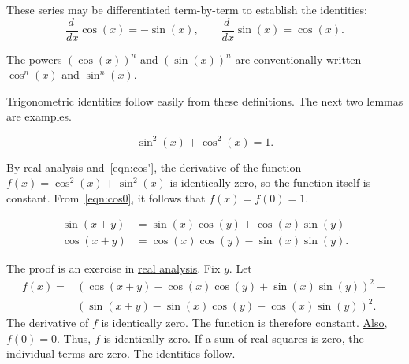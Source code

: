 These series may be differentiated term-by-term to establish the identities:
%
    \begin{equation}\label{eqn:cos'}
    \frac{d\phantom{~}} {dx}\cos(x) = -\sin(x),\qquad \frac{ d\phantom{~} }{dx}\sin(x) = \cos(x).
    \end{equation}

The powers $(\cos(x))^n$ and $(\sin(x))^n$ are conventionally written
$\cos^n(x)$ and $\sin^n(x)$.

Trigonometric identities follow easily from these definitions.  The next two lemmas are examples.
%

\begin{lemma}\label{lemma:circle} 
   $$\sin^2(x) + \cos^2(x) = 1.$$
\end{lemma}
%

\begin{proved}
By \hyperref[back:analysis]{real analysis} and~\eqref{eqn:cos'},
the derivative of the function $f(x) = \cos^2(x) +\sin^2(x)$ is
identically zero, so the function itself is constant.  From~\eqref{eqn:cos0}, it follows that $f(x)=f(0)=1$.
\swallowed\end{proved}


\begin{lemma}\label{lemma:sin-add}
  $$\begin{array}{lll}
  \sin(x+y) &= \sin(x)\cos(y) + \cos(x)\sin(y)\\
  \cos(x+y)  &= \cos(x)\cos(y) - \sin(x)\sin(y).
  \end{array}$$
\end{lemma}
%

\begin{proved}
The proof is an exercise in \hyperref[back:analysis]{real analysis}.
Fix $y$.  Let
    $$\begin{array}{lll}
    f(x) = &(\cos(x+y) - \cos(x)\cos(y) +
    \sin(x)\sin(y))^2 +\\ & (\sin(x+y) -\sin(x)\cos(y) -
    \cos(x)\sin(y))^2.
    \end{array}$$
The derivative of $f$ is identically zero.  The function is therefore constant.  \hyperref[eqn:cos0]{Also}, $f(0)=0$.  Thus, $f$ is identically zero.
If a sum of real squares is zero, the individual terms are zero. The
identities follow.
\swallowed\end{proved}

